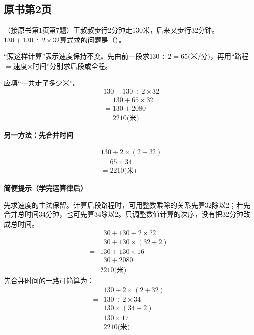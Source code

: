 

\subsection*{原书第2页}

（接原书第1页第7题）王叔叔步行2分钟走130米，后来又步行32分钟。\(130+130\div2\times32\)算式求的问题是（\hspace{1.8em}）。\par
\begin{BookAnswer}
“照这样计算”表示速度保持不变。先由前一段求\(130\div2=65\text{(米/分)}\)，再用“路程\(=\)速度\(\times\)时间”分别求后段或全程。\par 应填“一共走了多少米”。\[\begin{aligned}&130+130\div2\times32\\&=130+65\times32\\&=130+2080\\&=2210\text{(米)}\end{aligned}\]\par \par\noindent\begin{minipage}{\linewidth}\textbf{另一方法：先合并时间}\par \[\begin{aligned}&130\div2\times(2+32)\\&=65\times34\\&=2210\text{(米)}\end{aligned}\]\end{minipage}\par \par\textbf{简便提示（学完运算律后）}\par 先求速度的主法保留。计算后段路程时，可用整数乘除的关系先算32除以2；若先合并总时间34分钟，也可先算34除以2。只调整数值计算的次序，没有把32分钟改成总时间。\[\begin{aligned}&130+130\div2\times32\\={}&130+130\times(32\div2)\\={}&130+130\times16\\={}&130+2080\\={}&2210\text{(米)}\end{aligned}\]先合并时间的一路可简算为：\[\begin{aligned}&130\div2\times(2+32)\\={}&130\div2\times34\\={}&130\times(34\div2)\\={}&130\times17\\={}&2210\text{(米)}\end{aligned}\]
\end{BookAnswer}

